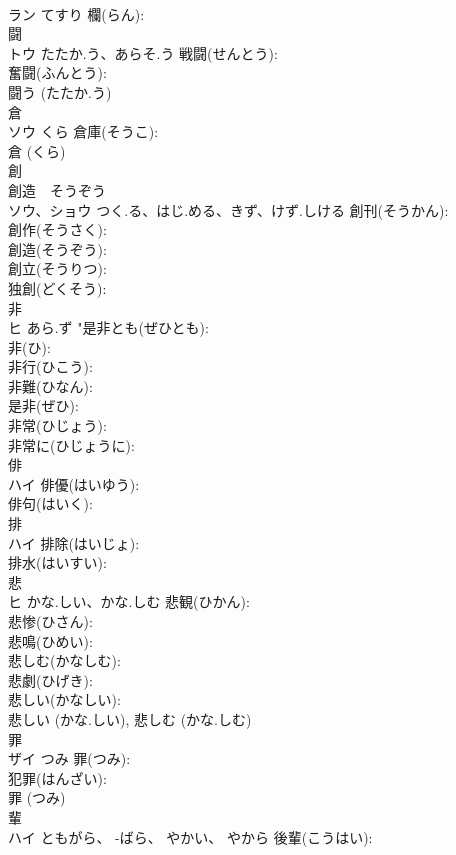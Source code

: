 \documentclass[8pt]{extreport}
\begin{document}
\begin{CJK}{UTF8}{min}
\\	ラン	てすり	欄(らん): 
\\	闘			
\\	トウ	たたか.う、あらそ.う	戦闘(せんとう): 
\\	奮闘(ふんとう): 
\\	闘う (たたか.う)
\\	倉			
\\	ソウ	くら	倉庫(そうこ): 
\\	倉 (くら)
\\	創			
\\	創造　そうぞう 
\\	ソウ、ショウ	つく.る、はじ.める、きず、けず.しける	創刊(そうかん): 
\\	創作(そうさく): 
\\	創造(そうぞう): 
\\	創立(そうりつ): 
\\	独創(どくそう): 
\\	非			
\\	ヒ	あら.ず	"是非とも(ぜひとも): 
\\	非(ひ): 
\\	非行(ひこう): 
\\	非難(ひなん): 
\\	是非(ぜひ): 
\\	非常(ひじょう): 
\\	非常に(ひじょうに): 
\\	俳			
\\	ハイ		俳優(はいゆう): 
\\	俳句(はいく): 
\\	排			
\\	ハイ		排除(はいじょ): 
\\	排水(はいすい): 
\\	悲			
\\	ヒ	かな.しい、かな.しむ	悲観(ひかん): 
\\	悲惨(ひさん): 
\\	悲鳴(ひめい): 
\\	悲しむ(かなしむ): 
\\	悲劇(ひげき): 
\\	悲しい(かなしい): 
\\	悲しい (かな.しい), 悲しむ (かな.しむ)
\\	罪			
\\	ザイ	つみ	罪(つみ): 
\\	犯罪(はんざい): 
\\	罪 (つみ)
\\	輩			
\\	ハイ	ともがら、 -ばら、 やかい、 やから	後輩(こうはい): 

\end{CJK}
\end{document}
